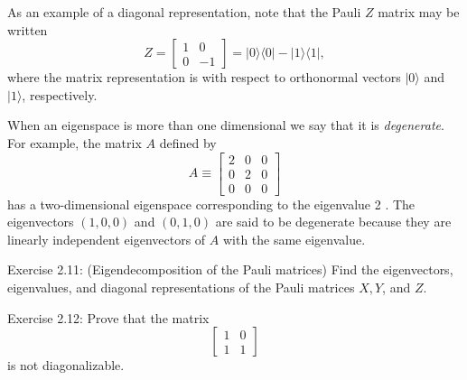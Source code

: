 \begin{example}
    As an example of a diagonal representation, note that the Pauli $Z$ matrix may be written
\begin{equation}
    Z=\left[\begin{array}{rr}
1 & 0 \\
0 & -1
\end{array}\right]=|0\rangle\langle 0|-| 1\rangle\langle 1|,
\end{equation}
where the matrix representation is with respect to orthonormal vectors $|0\rangle$ and $|1\rangle$, respectively. 
\end{example}

When an eigenspace is more than one dimensional we say that it is \textit{degenerate}. For example, the matrix $A$ defined by
\begin{equation}
    A \equiv\left[\begin{array}{lll}
2 & 0 & 0 \\
0 & 2 & 0 \\
0 & 0 & 0
\end{array}\right]
\end{equation}
has a two-dimensional eigenspace corresponding to the eigenvalue 2 . The eigenvectors $(1,0,0)$ and $(0,1,0)$ are said to be degenerate because they are linearly independent eigenvectors of $A$ with the same eigenvalue.

\begin{exercise}
    Exercise 2.11: (Eigendecomposition of the Pauli matrices) Find the eigenvectors, eigenvalues, and diagonal representations of the Pauli matrices $X, Y$, and $Z$.
\end{exercise}

\begin{exercise}
    Exercise 2.12: Prove that the matrix
\begin{equation}
    \left[\begin{array}{ll}
1 & 0 \\
1 & 1
\end{array}\right]
\end{equation}
is not diagonalizable.
\end{exercise}

